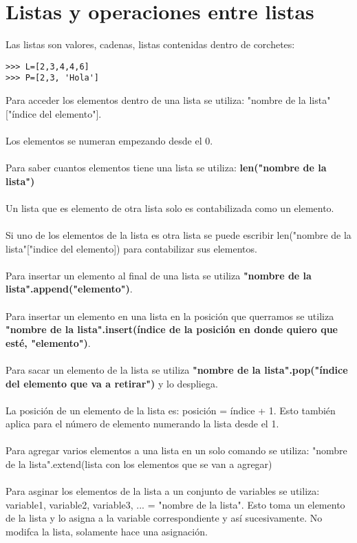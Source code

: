 \documentclass[letterpaper, 12pt, oneside]{article}%
\begin{document}
\section{Listas y operaciones entre listas}

Las listas son valores, cadenas, listas contenidas dentro de corchetes:
\begin{verbatim}
>>> L=[2,3,4,4,6]
>>> P=[2,3, 'Hola']
\end{verbatim}
Para acceder los elementos dentro de una lista se utiliza:
"nombre de la lista"["índice del elemento"].
\\\\
Los elementos se numeran empezando desde el 0.
\\\\
Para saber cuantos elementos tiene una lista se utiliza:
\textbf{len("nombre de la lista")}
\\\\
Un lista que es elemento de otra lista solo es contabilizada como un elemento.
\\\\ 
Si uno de los elementos de la lista es otra lista se puede escribir len("nombre de la lista"["indice del elemento]) para contabilizar sus elementos.
\\\\
Para insertar un elemento al final de una lista se utiliza \textbf{"nombre de la lista".append("elemento")}.
\\\\
Para insertar un elemento en una lista en la posición que querramos se utiliza \textbf{"nombre de la lista".insert(índice de la posición en donde quiero que esté, "elemento")}.
\\\\
Para sacar un elemento de la lista se utiliza \textbf{"nombre de la lista".pop("índice del elemento que va a retirar")} y lo despliega.
\\\\
La posición de un elemento de la lista es: posición = índice + 1. Esto también aplica para el número de elemento numerando la lista desde el 1.
\\\\
Para agregar varios elementos a una lista en un solo comando se utiliza: "nombre de la lista".extend(lista con los elementos que se van a agregar) 
\\\\
Para asginar los elementos de la lista a un conjunto de variables se utiliza:
variable1, variable2, variable3, ... = "nombre de la lista". Esto toma un elemento de la lista y lo asigna a la variable correspondiente y así sucesivamente. No modifca la lista, solamente hace una asignación. 
\end{document}
